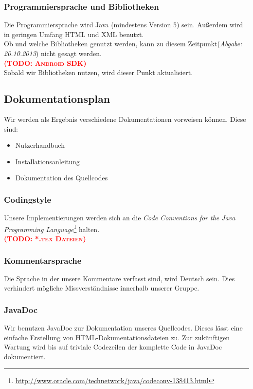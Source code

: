 \documentclass[fontsize=12pt,paper=a4,twoside]{scrartcl}
\newcommand{\todo}[1]{\textbf{\textsc{\textcolor{red}{(TODO: #1)}}}}
\begin{document}
\subsubsection{Programmiersprache und Bibliotheken}
Die Programmiersprache wird Java  (mindestens Version 5) sein. Außerdem wird in geringen Umfang HTML und XML benutzt.\\
Ob und welche Bibliotheken genutzt werden, kann zu diesem Zeitpunkt(\emph{Abgabe: 20.10.2013}) nicht gesagt werden.\\
\todo{Android SDK}
\\
Sobald wir Bibliotheken nutzen, wird dieser Punkt aktualisiert.
\subsection{Dokumentationsplan}
Wir werden als Ergebnis verschiedene Dokumentationen vorweisen können. Diese sind:

\begin{itemize}
\item{Nutzerhandbuch}
\item{Installationsanleitung}
\item{Dokumentation des Quellcodes}
\end{itemize}

\subsubsection{Codingstyle}
Unsere Implementierungen werden sich an die \emph{Code Conventions for the Java Programming Language}\footnote{\url{http://www.oracle.com/technetwork/java/codeconv-138413.html}} halten.\\
\todo{*.tex Dateien}

\subsubsection{Kommentarsprache}
Die Sprache in der unsere Kommentare verfasst sind, wird Deutsch sein. Dies verhindert mögliche Missverständnisse innerhalb unserer Gruppe.

\subsubsection{JavaDoc}
Wir benutzen JavaDoc zur Dokumentation unseres Quellcodes. Dieses lässt eine einfache Erstellung von HTML-Dokumentationsdateien zu.
Zur zukünftigen Wartung wird bis auf triviale Codezeilen der komplette Code in JavaDoc dokumentiert.
\end{document}
